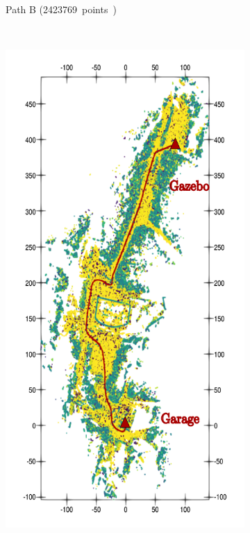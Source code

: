 \begin{figure}[htpb]
\begin{center}
\begin{subfigure}[b]{0.32\textwidth}
			\label{fig:ltr_b}
			\caption{Path B (\SI{2423769} points)}
		\end{subfigure}%
		~
		\begin{subfigure}[b]{0.32\textwidth}
			\includegraphics[width=\linewidth]{figs/ltr_map_traj/path_c.pdf}

\end{subfigure}
\end{center}
\end{figure}

